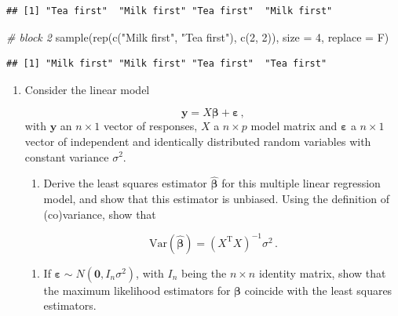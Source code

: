 \documentclass[
]{book}
\newenvironment{Shaded}{\begin{snugshade}}{\end{snugshade}}
\newcommand{\AttributeTok}[1]{\textcolor[rgb]{0.77,0.63,0.00}{#1}}
\newcommand{\CommentTok}[1]{\textcolor[rgb]{0.56,0.35,0.01}{\textit{#1}}}
\newcommand{\DecValTok}[1]{\textcolor[rgb]{0.00,0.00,0.81}{#1}}
\newcommand{\FunctionTok}[1]{\textcolor[rgb]{0.00,0.00,0.00}{#1}}
\newcommand{\NormalTok}[1]{#1}
\newcommand{\StringTok}[1]{\textcolor[rgb]{0.31,0.60,0.02}{#1}}
\providecommand{\tightlist}{%
  \setlength{\itemsep}{0pt}\setlength{\parskip}{0pt}}
\theoremstyle{definition}
\theoremstyle{definition}
\theoremstyle{definition}
\theoremstyle{definition}
\theoremstyle{remark}
\begin{document}
\begin{verbatim}
## [1] "Tea first"  "Milk first" "Tea first"  "Milk first"
\end{verbatim}

\begin{Shaded}
\begin{Highlighting}[]
    \CommentTok{\# block 2}
    \FunctionTok{sample}\NormalTok{(}\FunctionTok{rep}\NormalTok{(}\FunctionTok{c}\NormalTok{(}\StringTok{"Milk first"}\NormalTok{, }\StringTok{"Tea first"}\NormalTok{), }\FunctionTok{c}\NormalTok{(}\DecValTok{2}\NormalTok{, }\DecValTok{2}\NormalTok{)), }\AttributeTok{size =} \DecValTok{4}\NormalTok{, }\AttributeTok{replace =}\NormalTok{ F)}
\end{Highlighting}
\end{Shaded}

\begin{verbatim}
## [1] "Milk first" "Milk first" "Tea first"  "Tea first"
\end{verbatim}

\begin{enumerate}
\def\labelenumi{\arabic{enumi}.}
\setcounter{enumi}{1}
\item
  Consider the linear model

  \[\boldsymbol{y}= X\boldsymbol{\beta}+ \boldsymbol{\varepsilon}\,,\]
  with \(\boldsymbol{y}\) an \(n\times 1\) vector of responses, \(X\) a \(n\times p\) model matrix and \(\boldsymbol{\varepsilon}\) a \(n\times 1\) vector of independent and identically distributed random variables with constant variance \(\sigma^2\).

  \begin{enumerate}
  \def\labelenumii{\alph{enumii}.}
  \tightlist
  \item
    Derive the least squares estimator \(\hat{\boldsymbol{\beta}}\) for this multiple linear regression model, and show that this estimator is unbiased. Using the definition of (co)variance, show that
  \end{enumerate}

  \[\mbox{Var}(\hat{\boldsymbol{\beta}}) = \left(X^{\mathrm{T}}X\right)^{-1}\sigma^2\,.\]

  \begin{enumerate}
  \def\labelenumii{\alph{enumii}.}
  \setcounter{enumii}{1}
  \tightlist
  \item
    If \(\boldsymbol{\varepsilon}\sim N (\boldsymbol{0},I_n\sigma^2)\), with \(I_n\) being the \(n\times n\) identity matrix, show that the maximum likelihood estimators for \(\boldsymbol{\beta}\) coincide with the least squares estimators.
  \end{enumerate}
\end{enumerate}
\end{document}
